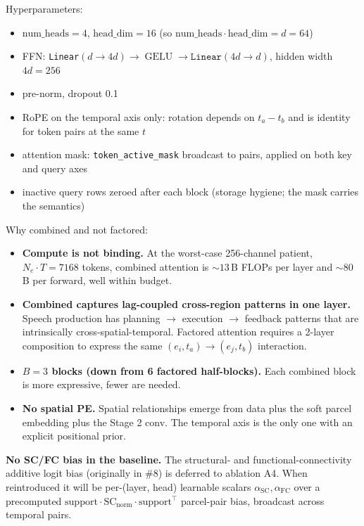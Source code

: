\documentclass[11pt,letterpaper]{article}
\begin{document}
Hyperparameters:
\begin{itemize}[leftmargin=2em, itemsep=0.2em]
\item $\text{num\_heads} = 4$, $\text{head\_dim} = 16$ (so $\text{num\_heads} \cdot \text{head\_dim} = d = 64$)
\item FFN: \texttt{Linear}$(d \rightarrow 4d) \rightarrow \operatorname{GELU} \rightarrow \texttt{Linear}(4d \rightarrow d)$, hidden width $4d = 256$
\item pre-norm, dropout 0.1
\item RoPE on the temporal axis only: rotation depends on $t_a - t_b$ and is identity for token pairs at the same $t$
\item attention mask: \texttt{token\_active\_mask} broadcast to pairs, applied on both key and query axes
\item inactive query rows zeroed after each block (storage hygiene; the mask carries the semantics)
\end{itemize}

Why combined and not factored:
\begin{itemize}[leftmargin=2em, itemsep=0.2em]
\item \textbf{Compute is not binding.} At the worst-case 256-channel patient, $N_e \cdot T = 7168$ tokens, combined attention is $\sim 13$\,B FLOPs per layer and $\sim 80$\,B per forward, well within budget.
\item \textbf{Combined captures lag-coupled cross-region patterns in one layer.} Speech production has planning $\rightarrow$ execution $\rightarrow$ feedback patterns that are intrinsically cross-spatial-temporal. Factored attention requires a 2-layer composition to express the same $(e_i, t_a) \rightarrow (e_j, t_b)$ interaction.
\item \textbf{$B = 3$ blocks (down from 6 factored half-blocks).} Each combined block is more expressive, fewer are needed.
\item \textbf{No spatial PE.} Spatial relationships emerge from data plus the soft parcel embedding plus the Stage 2 conv. The temporal axis is the only one with an explicit positional prior.
\end{itemize}

\textbf{No SC/FC bias in the baseline.} The structural- and functional-connectivity additive logit bias (originally in \#8) is deferred to ablation A4. When reintroduced it will be per-(layer, head) learnable scalars $\alpha_{\text{SC}}, \alpha_{\text{FC}}$ over a precomputed $\text{support} \cdot \text{SC}_{\text{norm}} \cdot \text{support}^\top$ parcel-pair bias, broadcast across temporal pairs.
\end{document}
